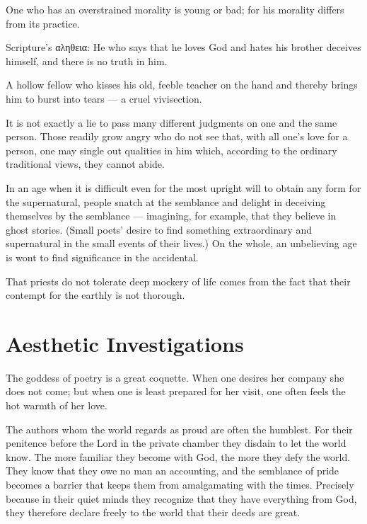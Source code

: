 \documentclass[12pt,a4paper]{article}
\newcommand{\opage}[1]{\marginnote{\footnotesize\textit{[#1]}}}
\newcommand{\aphsep}{\par\smallskip\centerline{\textasteriskcentered}\smallskip}
\begin{document}
One who has an overstrained morality is young or bad; for his morality differs
from its practice.

\aphsep

Scripture's αληθεια: He who says that he loves God and \opage{36}hates his
brother deceives himself, and there is no truth in him.

\aphsep

A hollow fellow who kisses his old, feeble teacher on the hand and thereby brings
him to burst into tears --- a cruel vivisection.

\aphsep

It is not exactly a lie to pass many different judgments on one and the same
person. Those readily grow angry who do not see that, with all one's love for a
person, one may single out qualities in him which, according to the ordinary
traditional views, they cannot abide.

\aphsep

In an age when it is difficult even for the most upright will to obtain any form
for the supernatural, people snatch at the semblance and delight in deceiving
themselves by the semblance --- imagining, for example, that they believe in
ghost stories. (Small poets' desire to find something extraordinary and
supernatural in the small events of their lives.) On the whole, an unbelieving
age is wont to find significance in the accidental.

\aphsep

That priests do not tolerate deep mockery of life comes from the fact that their
contempt for the earthly is not thorough.

\bigskip

\section*{Aesthetic Investigations}
\label{ch:006}

The goddess of poetry is a great coquette. When one desires her company she does
not come; but when one is least prepared for her visit, one often feels the hot
warmth of her love.

\aphsep

The authors whom the world regards as proud are often the humblest. For their
penitence before the Lord in the private chamber they disdain to let the world
know. The more familiar they become with God, the more they defy the world. They
know that they owe no man an accounting, and the semblance of pride becomes a
barrier that keeps them from amalgamating with the times. Precisely because in
their quiet minds they recognize that they have everything from God, they
therefore declare freely to the world that their deeds are great.
\end{document}
